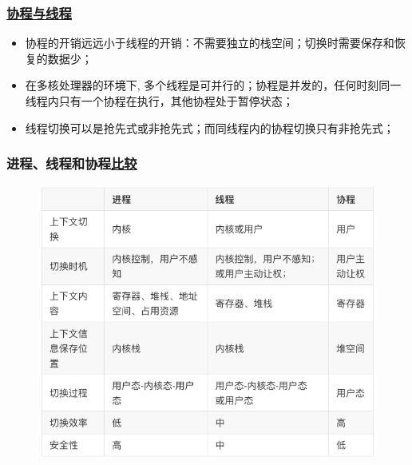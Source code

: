 \begin{frame}[fragile]
    \frametitle{\href{https://www.cnblogs.com/theRhyme/p/14061698.html}{协程与线程}}

    \begin{itemize}
        \item 协程的开销远远小于线程的开销：不需要独立的栈空间；切换时需要保存和恢复的数据少； \pause
        \item 在多核处理器的环境下, 多个线程是可并行的；协程是并发的，任何时刻同一线程内只有一个协程在执行，其他协程处于暂停状态； \pause
        \item 线程切换可以是抢先式或非抢先式；而同线程内的协程切换只有非抢先式；
    \end{itemize}

% 

\end{frame}
\begin{frame}[fragile]
    \frametitle{进程、线程和协程\href{https://www.cnblogs.com/theRhyme/p/14061698.html}{比较}}
% 
	\begin{figure}
		\centering
		\includegraphics[width=0.55\linewidth]{figs/proc-thread-coroutine.png}
	\end{figure}
\end{frame}

